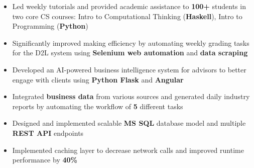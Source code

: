 \documentclass[10pt,a4paper]{altacv}
\begin{document}
 \divider
 
 \begin{itemize} 
 \item Led weekly tutorials and provided academic assistance to \textbf{100+} students in two core CS courses: Intro to Computational Thinking (\textbf{Haskell}), Intro to Programming (\textbf{Python})
 \item Significantly improved making efficiency by automating weekly grading tasks for the D2L system using 
\textbf{Selenium web automation} and \textbf{data scraping}
 
 
 \end{itemize}
\divider

\begin{itemize}
  \item Developed an AI-powered business intelligence system for advisors to better engage with clients using \textbf{Python Flask} and \textbf{Angular}
  \item Integrated \textbf{business data} from various sources and generated daily industry reports by automating the workflow of \textbf{5} different tasks
  \item Designed and implemented scalable \textbf{MS SQL} database model and multiple \textbf{REST API }endpoints
  \item Implemented caching layer to decrease network calls and improved runtime performance by \textbf{40\%}

 \end{itemize} 




         \\
       
\divider\smallskip
{}     
 


\vspace{2.3mm}
\vspace{2.3mm}
\end{document}
